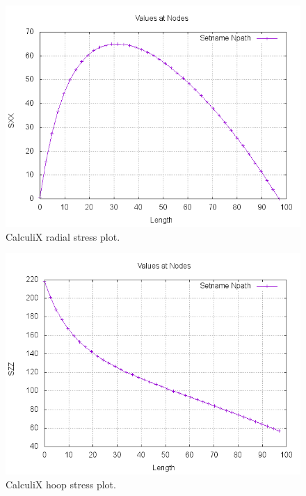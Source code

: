 \documentclass[12pt, a4paper, twoside]{article}
\begin{document}
\begin{figure}[h]
	\centering
	\includegraphics[scale=0.5]{graph_0}
	\caption{CalculiX radial stress plot.}
	\label{fig:graph_0}
\end{figure}

\begin{figure}[h]
	\centering
	\includegraphics[scale=0.5]{graph_1}
	\caption{CalculiX hoop stress plot.}
	\label{fig:graph_1}
\end{figure}
\end{document}
